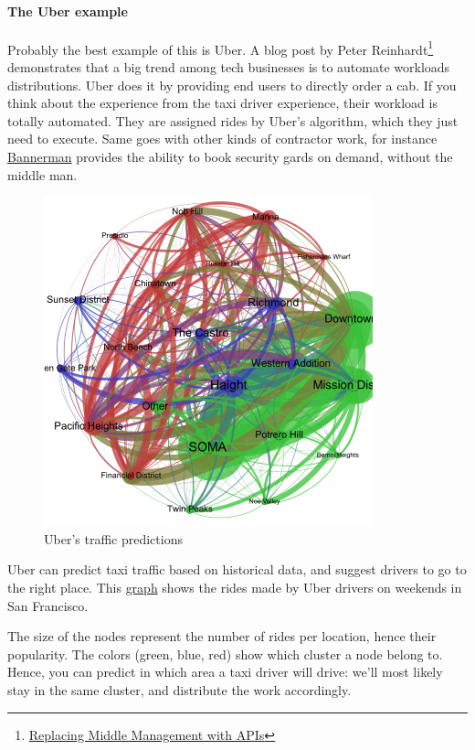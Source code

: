 \documentclass[12pt]{article}
\begin{document}
\paragraph{The Uber example}

Probably the best example of this is Uber. A blog post by Peter
Reinhardt\footnote{\href{http://rein.pk/replacing-middle-management-with-apis/}
{Replacing Middle Management with APIs}} demonstrates that a big trend among
tech businesses is to automate workloads distributions. Uber does it by
providing end users to directly order a cab. If you think about the experience
from the taxi driver experience, their workload is totally automated. They are
assigned rides by Uber's algorithm, which they just need to execute. Same goes
with other kinds of contractor work, for instance
\href{https://www.getbannerman.com/}{Bannerman} provides the ability to book
security gards on demand, without the middle man.


\begin{figure}[h]
    \centering
    \includegraphics[scale=0.8]{uber-graph}
    \caption{Uber's traffic predictions}
    \label{fig:uber-graph}
\end{figure}

\smallskip

Uber can predict taxi traffic based on historical data, and suggest drivers to
go to the right place. This
\href{http://blogs.mathworks.com/loren/2014/09/06/analyzing-uber-ride-sharing-gps-data/}
{graph} shows the rides made by Uber drivers on weekends in San Francisco.

The size of the nodes represent the number of rides per location, hence their
popularity. The colors (green, blue, red) show which cluster a node belong to.
Hence, you can predict in which area a taxi driver will drive: we'll most likely
stay in the same cluster, and distribute the work accordingly.
\end{document}
